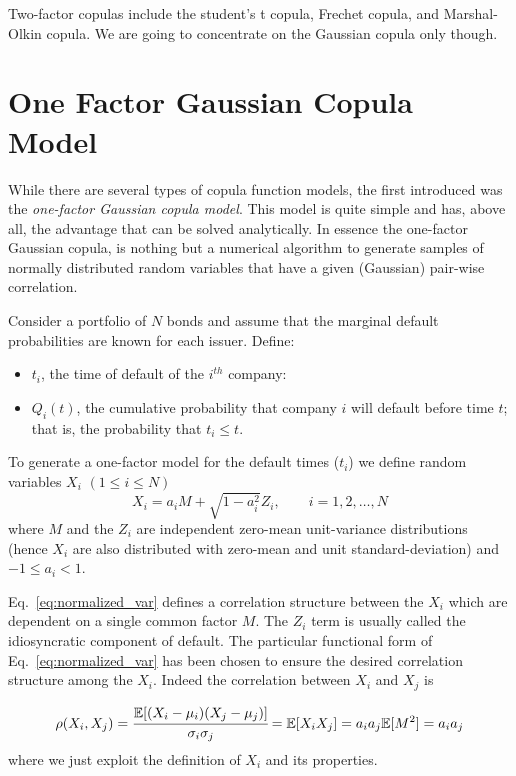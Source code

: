 Two-factor copulas include the student’s t copula, Frechet copula, and Marshal-Olkin copula. We are going to concentrate on the Gaussian copula only though.

\section{One Factor Gaussian Copula Model}
While there are several types of copula function models, the first introduced was the \emph{one-factor Gaussian copula model}. This model is quite simple and has, above all, the advantage that can be solved analytically. In essence the one-factor Gaussian copula, is nothing but a numerical algorithm to generate samples of normally distributed random variables that have a given (Gaussian) pair-wise correlation. 

Consider a portfolio of \(N\) bonds and assume that the marginal default probabilities are known for each issuer. Define:

\begin{itemize}
	\tightlist
	\item
	\(t_i\), the time of default of the \(i^{th}\) company:
	\item
	\(Q_i(t)\), the cumulative probability that company \(i\) will default
	before time \(t\); that is, the probability that \(t_i \le t\).
\end{itemize}

To generate a one-factor model for the default times (\(t_i\)) we define random
variables \(X_i\) \((1\le i \le N)\)
\begin{equation}
X_i = a_i M + \sqrt{1-a_i^2}Z_i,\qquad i = 1, 2,\ldots, N
\label{eq:normalized_var}
\end{equation}
where \(M\) and the \(Z_i\) are independent zero-mean unit-variance  distributions (hence $X_i$ are also distributed with zero-mean and unit standard-deviation) and \(-1 \le a_i \lt 1\).

Eq.~\ref{eq:normalized_var} defines a correlation structure between the \(X_i\) which are dependent on a single common factor \(M\). The $Z_i$ term is usually called the idiosyncratic component of default. The particular functional form of Eq.~\ref{eq:normalized_var} has been chosen to ensure the desired correlation structure among the $X_i$. Indeed the correlation between \(X_i\) and \(X_j\) is

\begin{equation*}
\rho(X_i, X_j) = \cfrac{\mathbb{E}[(X_i-\mu_i)(X_j-\mu_j)]}{\sigma_{i}\sigma_{j}} =\mathbb{E}[X_i X_j] = a_i a_j \mathbb{E}[M^2] = a_i a_j
\end{equation*}
where we just exploit the definition of $X_i$ and its properties.

